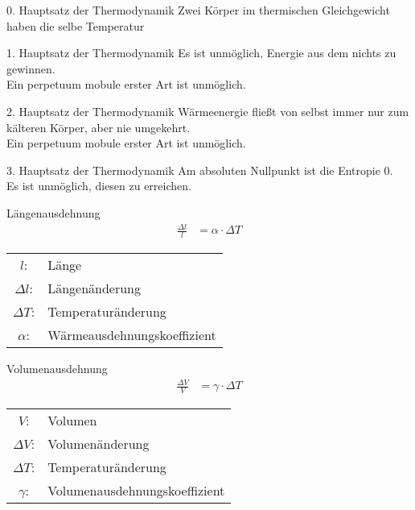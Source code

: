 %


\begin{karte}{0. Hauptsatz der Thermodynamik}
    Zwei Körper im thermischen Gleichgewicht haben die selbe Temperatur
\end{karte}

\begin{karte}{1. Hauptsatz der Thermodynamik}
    Es ist unmöglich, Energie aus dem nichts zu gewinnen. \\
    Ein perpetuum mobule erster Art ist unmöglich.
\end{karte}

\begin{karte}{2. Hauptsatz der Thermodynamik}
    Wärmeenergie fließt von selbst immer nur zum kälteren Körper, aber nie umgekehrt. \\
    Ein perpetuum mobule erster Art ist unmöglich.
\end{karte}

\begin{karte}{3. Hauptsatz der Thermodynamik}
    Am absoluten Nullpunkt ist die Entropie 0. \\
    Es ist unmöglich, diesen zu erreichen.
\end{karte}

\begin{karte}{Längenausdehnung}
    \begin{align*}
        \frac{\Delta l}{l} &= \alpha \cdot \Delta T
    \end{align*}
    \begin{tabular}[t]{cl}
        \( l \): & Länge \\
        \( \Delta l \): & Längenänderung \\
        \( \Delta T \): & Temperaturänderung \\
        \( \alpha \): & Wärmeausdehnungskoeffizient
    \end{tabular}
\end{karte}

\begin{karte}{Volumenausdehnung}
    \begin{align*}
        \frac{\Delta V}{V} &= \gamma \cdot \Delta T
    \end{align*}
    \begin{tabular}[t]{cl}
        \( V \): & Volumen \\
        \( \Delta V \): & Volumenänderung \\
        \( \Delta T \): & Temperaturänderung \\
        \( \gamma \): & Volumenausdehnungskoeffizient
    \end{tabular}
\end{karte}

